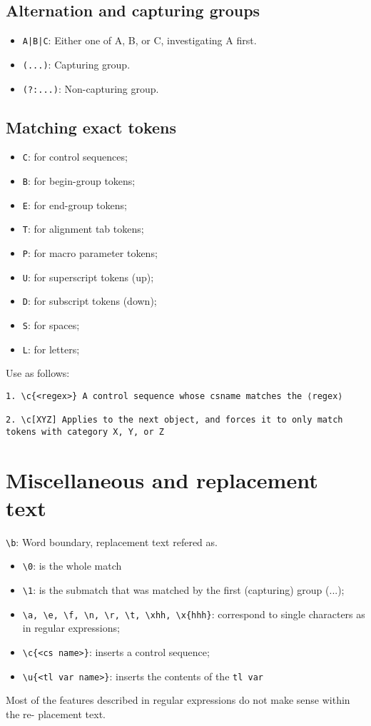 \documentclass{article}
\begin{document}
\subsection{Alternation and capturing groups}
\begin{itemize}
  \item \verb!A|B|C!: Either one of A, B, or C, investigating A first.
  \item \verb|(...)|: Capturing group.
  \item \verb|(?:...)|: Non-capturing group.
\end{itemize}

\subsection{Matching exact tokens}
\begin{itemize}
  \item \verb|C|: for control sequences;
  \item \verb|B|: for begin-group tokens;
  \item \verb|E|: for end-group tokens;
  \item \verb|T|: for alignment tab tokens;
  \item \verb|P|: for macro parameter tokens;
  \item \verb|U|: for superscript tokens (up);
  \item \verb|D|: for subscript tokens (down);
  \item \verb|S|: for spaces;
  \item \verb|L|: for letters;
\end{itemize}

Use as follows:
\begin{verbatim}
1. \c{<regex>} A control sequence whose csname matches the ⟨regex⟩

2. \c[XYZ] Applies to the next object, and forces it to only match tokens with category X, Y, or Z
\end{verbatim}

\section{Miscellaneous and replacement text}
\verb|\b|: Word boundary, replacement text refered as.
\begin{itemize}
  \item \verb|\0|: is the whole match
  \item \verb|\1|: is the submatch that was matched by the first (capturing) group (...);
  \item \verb|\a, \e, \f, \n, \r, \t, \xhh, \x{hhh}|: correspond to single characters as in regular
    expressions;
  \item \verb|\c{<cs name>}|: inserts a control sequence;
  \item \verb|\u{<tl var name>}|: inserts the contents of the \verb|tl var|
\end{itemize}
Most of the features described in regular expressions do not make sense within the re-
placement text.
\end{document}
